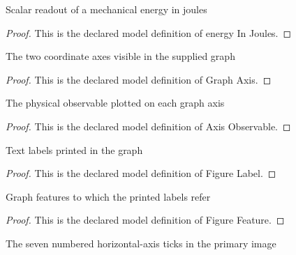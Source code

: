 \begin{definition}
  \label{def:physics:phyx-mini-0259:phyxminiproblems-problemphyxmini0259-energyinjoules}
  Scalar readout of a mechanical energy in joules
\end{definition}
\begin{proof}
  This is the declared model definition of energy In Joules.
\end{proof}
\begin{definition}
  \label{def:physics:phyx-mini-0259:phyxminiproblems-problemphyxmini0259-graphaxis}
  The two coordinate axes visible in the supplied graph
\end{definition}
\begin{proof}
  This is the declared model definition of Graph Axis.
\end{proof}
\begin{definition}
  \label{def:physics:phyx-mini-0259:phyxminiproblems-problemphyxmini0259-axisobservable}
  The physical observable plotted on each graph axis
\end{definition}
\begin{proof}
  This is the declared model definition of Axis Observable.
\end{proof}
\begin{definition}
  \label{def:physics:phyx-mini-0259:phyxminiproblems-problemphyxmini0259-figurelabel}
  Text labels printed in the graph
\end{definition}
\begin{proof}
  This is the declared model definition of Figure Label.
\end{proof}
\begin{definition}
  \label{def:physics:phyx-mini-0259:phyxminiproblems-problemphyxmini0259-figurefeature}
  Graph features to which the printed labels refer
\end{definition}
\begin{proof}
  This is the declared model definition of Figure Feature.
\end{proof}
\begin{definition}
  \label{def:physics:phyx-mini-0259:phyxminiproblems-problemphyxmini0259-horizontaltick}
  The seven numbered horizontal-axis ticks in the primary image
\end{definition}
